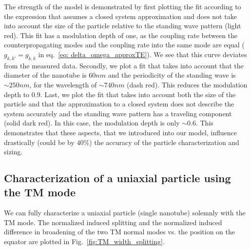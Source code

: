 \documentclass[journal=jacsat,manuscript=article]{achemso}
\begin{document}
The strength of the model is demonstrated by first plotting the fit according to the expression that assumes a closed system approximation and does not take into account the size of the particle relative to the standing wave pattern (light red). This fit has a modulation depth of one, as the coupling rate between the counterpropagating modes and the coupling rate into the same mode are equal ($g_{k,k'}=g_{k,k}$ in eq.~\ref{eq: delta_omega_approxTE}). We see that this curve deviates from the measured data. Secondly, we plot a fit that takes into account that the diameter of the nanotube is $60nm$ and the periodicity of the standing wave is $\sim 250nm$, for the wavelength of $\sim740nm$ (dash red). This reduces the modulation depth to $0.9$. Last, we plot the fit that takes into account both the size of the particle and that the approximation to a closed system does not describe the system accurately and the standing wave pattern has a traveling component (solid dark red). In this case, the modulation depth is only $\sim0.6$. This demonstrates that these aspects, that we introduced into our model, influence drastically (could be by $40\%$) the accuracy of the particle characterization and sizing.

\subsection{Characterization of a uniaxial particle using the TM mode}

We can fully characterize a uniaxial particle (single  nanotube) solemnly with the TM mode. The normalized induced splitting and the normalized induced difference in broadening of the two TM normal modes vs. the position on the equator are plotted in Fig.~\ref{fig:TM_width_splitting}.
\end{document}
